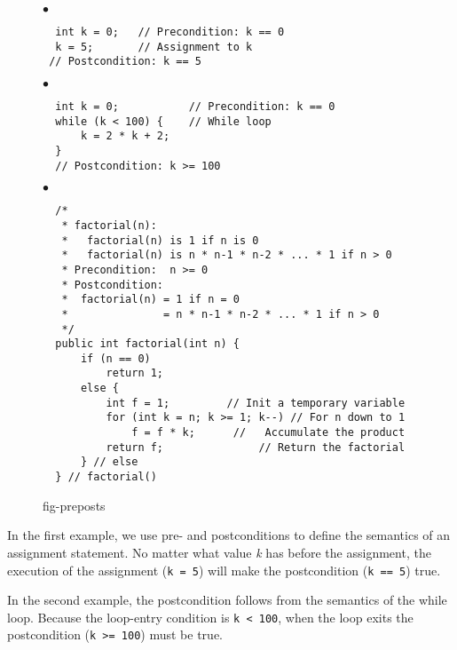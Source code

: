 \begin{figure}[htb]
\jjjprogstart
\mbox{$\bullet$} \vspace{-18pt}
\begin{jjjlisting}
\begin{lstlisting}
  int k = 0;   // Precondition: k == 0
  k = 5;       // Assignment to k
 // Postcondition: k == 5
\end{lstlisting}
\end{jjjlisting}


\mbox{$\bullet$} \vspace{-18pt}
\begin{jjjlisting}
\begin{lstlisting}
  int k = 0;           // Precondition: k == 0
  while (k < 100) {    // While loop
      k = 2 * k + 2;
  }
  // Postcondition: k >= 100
\end{lstlisting}
\end{jjjlisting}


\mbox{$\bullet$} \vspace{-18pt}
\begin{jjjlisting}
\begin{lstlisting}
  /*
   * factorial(n):
   *   factorial(n) is 1 if n is 0
   *   factorial(n) is n * n-1 * n-2 * ... * 1 if n > 0
   * Precondition:  n >= 0
   * Postcondition: 
   *  factorial(n) = 1 if n = 0
   *               = n * n-1 * n-2 * ... * 1 if n > 0
   */
  public int factorial(int n) {
      if (n == 0)
          return 1;
      else {
          int f = 1;         // Init a temporary variable
          for (int k = n; k >= 1; k--) // For n down to 1
              f = f * k;      //   Accumulate the product
          return f;               // Return the factorial
      } // else
  } // factorial()
\end{lstlisting}
\end{jjjlisting}
{fig-preposts}
\end{figure}

In the first example, we use pre- and postconditions to define
the semantics of an assignment statement. No matter what value {\it k} has
before the assignment, the execution of the assignment ({\tt k = 5}) will make
the postcondition ({\tt k == 5}) true.

In the second example, the postcondition follows from the semantics of
the while loop. Because the loop-entry condition is \verb|k < 100|,
when the loop exits the postcondition (\verb|k >= 100|) must be true.


